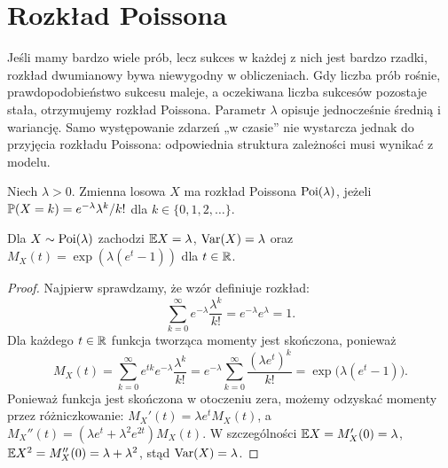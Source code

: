 \section{Rozkład Poissona}
Jeśli mamy bardzo wiele prób, lecz sukces w każdej z nich jest
bardzo rzadki, rozkład dwumianowy bywa niewygodny w obliczeniach.
Gdy liczba prób rośnie, prawdopodobieństwo sukcesu maleje, a
oczekiwana liczba sukcesów pozostaje stała, otrzymujemy
rozkład Poissona. Parametr $\lambda$ opisuje jednocześnie
średnią i wariancję. Samo występowanie zdarzeń „w czasie” nie
wystarcza jednak do przyjęcia rozkładu Poissona: odpowiednia
struktura zależności musi wynikać z modelu.

\begin{definicja}
Niech $\lambda>0$. Zmienna losowa $X$ ma rozkład Poissona
$\operatorname{Poi}(\lambda)$, jeżeli
$\mathbb{P}(X=k)=e^{-\lambda}\lambda^k/k!$ dla
$k\in\{0,1,2,\ldots\}$.
\end{definicja}

\begin{stwierdzenie}
Dla $X\sim\operatorname{Poi}(\lambda)$ zachodzi
$\mathbb{E} X=\lambda$, $\operatorname{Var}(X)=\lambda$ oraz
$M_X(t)=\exp(\lambda(e^t-1))$ dla $t\in\mathbb{R}$.
\end{stwierdzenie}
\begin{proof}
Najpierw sprawdzamy, że wzór definiuje rozkład:
\[
\sum_{k=0}^\infty e^{-\lambda}\frac{\lambda^k}{k!}
=e^{-\lambda}e^\lambda=1.
\]
Dla każdego $t\in\mathbb{R}$ funkcja tworząca momenty jest
skończona, ponieważ
\[
M_X(t)=\sum_{k=0}^\infty e^{tk}
 e^{-\lambda}\frac{\lambda^k}{k!}
=e^{-\lambda}\sum_{k=0}^\infty\frac{(\lambda e^t)^k}{k!}
=\exp\bigl(\lambda(e^t-1)\bigr).
\]
Ponieważ funkcja jest skończona w otoczeniu zera,
możemy odzyskać momenty przez różniczkowanie:
$M_X'(t)=\lambda e^tM_X(t)$,
a $M_X''(t)=(\lambda e^t+\lambda^2e^{2t})M_X(t)$.
W szczególności $\mathbb{E} X=M_X'(0)=\lambda$,
$\mathbb{E} X^2=M_X''(0)=\lambda+\lambda^2$,
stąd $\operatorname{Var}(X)=\lambda$.
\end{proof}

